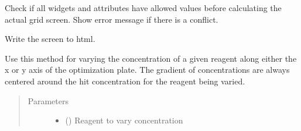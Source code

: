 \documentclass[letterpaper,10pt,english]{sphinxmanual}
\begin{document}
\begin{fulllineitems}

\begin{fulllineitems}
\label{\detokenize{polo.widgets:polo.widgets.optimize_widget.OptimizeWidget.error_checker}}
Check if all widgets and attributes have allowed values before
calculating the actual grid screen. Show error message if there is
a conflict.

\end{fulllineitems}


\begin{fulllineitems}
\label{\detokenize{polo.widgets:polo.widgets.optimize_widget.OptimizeWidget.export_screen}}
Write the screen to html.

\end{fulllineitems}


\begin{fulllineitems}
\label{\detokenize{polo.widgets:polo.widgets.optimize_widget.OptimizeWidget.gradient}}
Use this method for varying the concentration of a given
reagent along either the x or y axis of the optimization plate. The
gradient of concentrations are always centered around the hit
concentration for the reagent being varied.
\begin{quote}\begin{description}
\item[{Parameters}] \leavevmode\begin{itemize}
\item {} 
 ({\hyperref[\detokenize{polo.crystallography:polo.crystallography.cocktail.Reagent}]{}}) \textendash{} Reagent to vary concentration


\end{itemize}
\end{description}
\end{quote}
\end{fulllineitems}
\end{fulllineitems}
\end{document}
